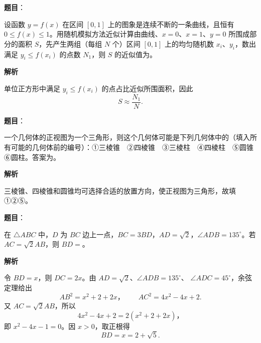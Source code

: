 \begin{answer}

\textbf{题目}：

设函数 $y=f(x)$ 在区间 $[0,1]$ 上的图象是连续不断的一条曲线，且恒有 $0\leq f(x)\leq1$。用随机模拟方法近似计算由曲线、$x=0$、$x=1$、$y=0$ 所围成部分的面积 $S$，先产生两组（每组 $N$ 个）区间 $[0,1]$ 上的均匀随机数 $x_i\text{、}y_i$，数出满足 $y_i\leq f(x_i)$ 的点数 $N_1$，则 $S$ 的近似值为\gkblank{}。

\textbf{解析}

单位正方形中满足 $y_i\leq f(x_i)$ 的点占比近似所围面积，因此
\nopagebreak[4]
\[S\approx\frac{N_1}{N}.
\]


\end{answer}
\begin{answer}

\textbf{题目}：

一个几何体的正视图为一个三角形，则这个几何体可能是下列几何体中的（填入所有可能的几何体前的编号）：①三棱锥　②四棱锥　③三棱柱　④四棱柱　⑤圆锥　⑥圆柱。答案为\gkblank{}。

\textbf{解析}

三棱锥、四棱锥和圆锥均可选择合适的放置方向，使正视图为三角形，故填
①②⑤。


\end{answer}
\begin{answer}

\textbf{题目}：

在 $\triangle ABC$ 中，$D$ 为 $BC$ 边上一点，$BC=3BD$，$AD=\sqrt2$，$\angle ADB=135^\circ$。若 $AC=\sqrt2 AB$，则 $BD=$\gkblank{}。

\textbf{解析}

令 $BD=x$，则 $DC=2x$。由 $AD=\sqrt2$、$\angle ADB=135^\circ$、
$\angle ADC=45^\circ$，余弦定理给出
\nopagebreak[4]
\[
AB^2=x^2+2+2x\text{，}\qquad AC^2=4x^2-4x+2.
\]
又 $AC=\sqrt2 AB$，所以
\nopagebreak[4]
\[
4x^2-4x+2=2(x^2+2+2x)\text{，}
\]
即 $x^2-4x-1=0$。因 $x>0$，取正根得
\nopagebreak[4]
\[
BD=x=2+\sqrt5.
\]


\end{answer}
